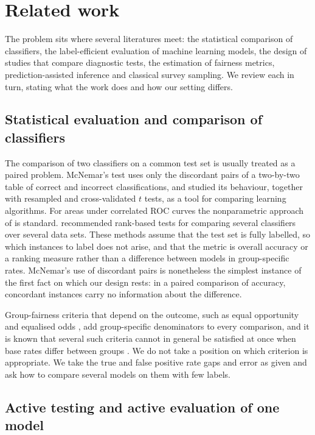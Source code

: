 \section{Related work}\label{sec:related}

The problem sits where several literatures meet: the statistical comparison of classifiers, the label-efficient evaluation of machine learning models, the design of studies that compare diagnostic tests, the estimation of fairness metrics, prediction-assisted inference and classical survey sampling. We review each in turn, stating what the work does and how our setting differs.

\subsection{Statistical evaluation and comparison of classifiers}

The comparison of two classifiers on a common test set is usually treated as a paired problem. McNemar's test \citep{mcnemar1947} uses only the discordant pairs of a two-by-two table of correct and incorrect classifications, and \citet{dietterich1998} studied its behaviour, together with resampled and cross-validated $t$ tests, as a tool for comparing learning algorithms. For areas under correlated ROC curves the nonparametric approach of \citet{delong1988} is standard. \citet{demsar2006} recommended rank-based tests for comparing several classifiers over several data sets. These methods assume that the test set is fully labelled, so which instances to label does not arise, and that the metric is overall accuracy or a ranking measure rather than a difference between models in group-specific rates. McNemar's use of discordant pairs is nonetheless the simplest instance of the first fact on which our design rests: in a paired comparison of accuracy, concordant instances carry no information about the difference.

Group-fairness criteria that depend on the outcome, such as equal opportunity and equalised odds \citep{hardt2016}, add group-specific denominators to every comparison, and it is known that several such criteria cannot in general be satisfied at once when base rates differ between groups \citep{chouldechova2017}. We do not take a position on which criterion is appropriate. We take the true and false positive rate gaps and error as given and ask how to compare several models on them with few labels.

\subsection{Active testing and active evaluation of one model}

